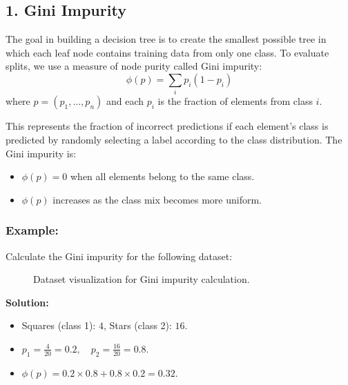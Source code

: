 \documentclass{article}
\begin{document}
\subsection*{1. Gini Impurity}
The goal in building a decision tree is to create the smallest possible tree in which each leaf node contains training data from only one class. To evaluate splits, we use a measure of node purity called Gini impurity:
\[
\phi(p) = \sum_{i} p_i (1 - p_i)
\]
where \( p = (p_1, \dots, p_n) \) and each \( p_i \) is the fraction of elements from class \( i \).

This represents the fraction of incorrect predictions if each element's class is predicted by randomly selecting a label according to the class distribution. The Gini impurity is:
\begin{itemize}
    \item \( \phi(p) = 0 \) when all elements belong to the same class.
    \item \( \phi(p) \) increases as the class mix becomes more uniform.
\end{itemize}

\subsubsection*{Example:}
Calculate the Gini impurity for the following dataset:
\begin{figure}[h]
    \centering
    \caption{Dataset visualization for Gini impurity calculation.}
\end{figure}

\textbf{Solution:}
\begin{itemize}
    \item Squares (class 1): \(4\), Stars (class 2): \(16\).
    \item \( p_1 = \frac{4}{20} = 0.2, \quad p_2 = \frac{16}{20} = 0.8 \).
    \item \( \phi(p) = 0.2 \times 0.8 + 0.8 \times 0.2 = 0.32 \).
\end{itemize}
\end{document}
